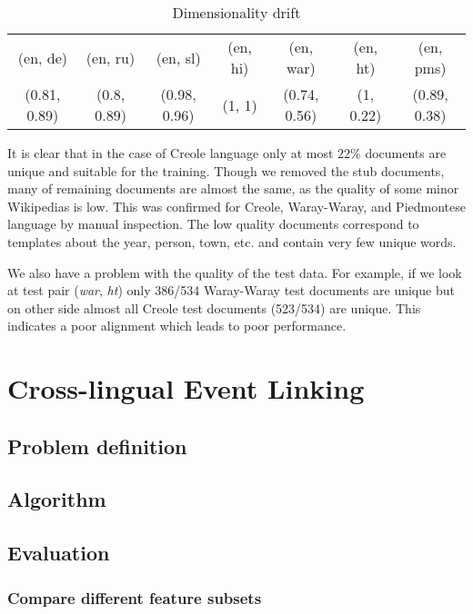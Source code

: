 \documentclass[twoside,11pt]{article}
\begin{document}
{\begin{table}[h]
\caption{Dimensionality drift}
\label{table:rank}
\begin{tabular}{|c|c|c|c|c|c|c|}
\cline{1-7}
(en, de)     &   (en, ru)     &   (en, sl)       &     (en, hi)&   (en, war)      &      (en, ht) &   (en, pms)\\
\cline{1-7}
(0.81, 0.89)   &  (0.8, 0.89)  &   (0.98, 0.96)    &    (1, 1)  &   (0.74, 0.56)  &      (1, 0.22)  &   (0.89, 0.38)\\
\cline{1-7}
\end{tabular}
\end{table}

It is clear that in the case of Creole language only at most $22\%$ documents are unique and suitable for the training. Though we removed the stub documents, many of remaining documents are almost the same, as the quality of some minor Wikipedias is low. This was confirmed for Creole, Waray-Waray, and Piedmontese language by manual inspection. The low quality documents correspond to templates about the year, person, town, etc. and contain very few unique words.

We also have a problem with the quality of the test data. For example, if we look at test pair (\emph{war}, \emph{ht}) only 386/534 Waray-Waray test documents are unique but on other side almost all Creole test documents (523/534) are unique. This indicates a poor alignment which leads to poor performance.
}

\section{Cross-lingual Event Linking}

\subsection{Problem definition}

\subsection{Algorithm}

\subsection{Evaluation}

\subsubsection{Compare different feature subsets}
\end{document}

